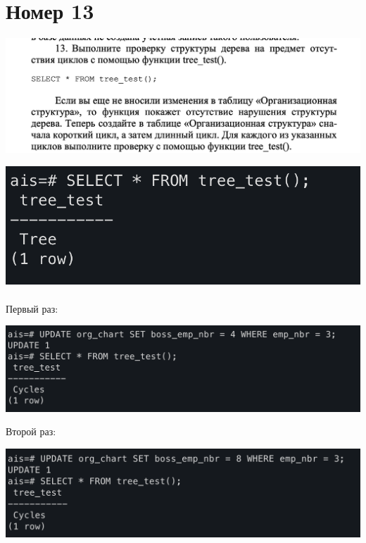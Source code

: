 \documentclass[a4paper,12pt]{article}
\begin{document}
\section*{Номер 13}
\begin{center}
\includegraphics[scale=0.5]{13_1.png}
\end{center}
\includegraphics[scale=0.8]{13_2.png}
\\\\
Первый раз:
\begin{flushleft}
\includegraphics[scale=0.6]{13_3.png}
\end{flushleft}
Второй раз:
\begin{flushleft}
\includegraphics[scale=0.6]{13_4.png}
\end{flushleft}
\clearpage
\end{document}
